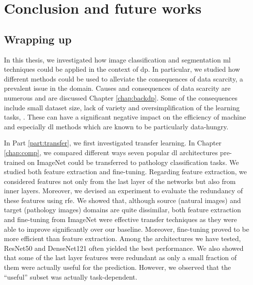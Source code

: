 \chapter{Conclusion and future works}
\label{chap:conclusions}

\section{Wrapping up}
\label{sec:concl:wrappingup}

In this thesis, we investigated how image classification and segmentation \acrlong{ml} techniques could be applied in the context of \acrlong{dp}. In particular, we studied how different methods could be used to alleviate the consequences of data scarcity, a prevalent issue in the domain. Causes and consequences of data scarcity are numerous and are discussed Chapter \ref{chap:backdp}. Some of the consequences include small dataset size, lack of variety and oversimplification of the learning tasks, \etc. These can have a significant negative impact on the efficiency of machine and especially \acrlong{dl} methods which are known to be particularly data-hungry. 

In Part \ref{part:transfer}, we first investigated transfer learning. In Chapter \ref{chap:comp}, we compared different ways seven popular \acrlong{dl} architectures pre-trained on ImageNet could be transferred to pathology classification tasks. We studied both feature extraction and fine-tuning. Regarding feature extraction, we considered features not only from the last layer of the networks but also from inner layers. Moreover, we devised an experiment to evaluate the redundancy of these features using \acrlong{rfe}. We showed that, although source (\ie natural images) and target (\ie pathology images) domains are quite dissimilar, both feature extraction and fine-tuning from ImageNet were effective transfer techniques as they were able to improve significantly over our baseline. Moreover, fine-tuning proved to be more efficient than feature extraction. Among the architectures we have tested, ResNet50 and DenseNet121 often yielded the best performance. We also showed that some of the last layer features were redundant as only a small fraction of them were actually useful for the prediction. However, we observed that the ``useful'' subset was actually task-dependent. 

